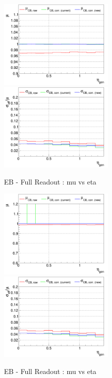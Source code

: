 \begin{figure}
\includegraphics[width=0.495\textwidth]{./ECAL_plots/plotsNOPU/EB/FULL/pdf/GENETA/EBFULL_GENETA_0020_0100_MuOverBins.pdf}
\includegraphics[width=0.495\textwidth]{./ECAL_plots/plotsNOPU/EB/FULL/pdf/GENETA/EBFULL_GENETA_0005_0020_EffSigmaOverBins.pdf}
\caption{EB - Full Readout : mu vs eta}
\end{figure}

\begin{figure}
\includegraphics[width=0.495\textwidth]{./ECAL_plots/plotsNOPU/EB/FULL/pdf/GENETA/EBFULL_GENETA_0100_0300_MuOverBins.pdf}
\includegraphics[width=0.495\textwidth]{./ECAL_plots/plotsNOPU/EB/FULL/pdf/GENETA/EBFULL_GENETA_0005_0020_EffSigmaOverBins.pdf}
\caption{EB - Full Readout : mu vs eta}
\end{figure}



